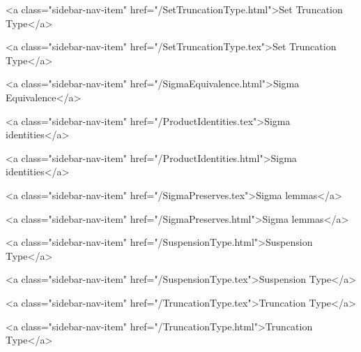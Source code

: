       
    
      
        
          <a class="sidebar-nav-item" href="/SetTruncationType.html">Set Truncation Type</a>
        
      
    
      
        
          <a class="sidebar-nav-item" href="/SetTruncationType.tex">Set Truncation Type</a>
        
      
    
      
        
          <a class="sidebar-nav-item" href="/SigmaEquivalence.html">Sigma Equivalence</a>
        
      
    
      
        
          <a class="sidebar-nav-item" href="/ProductIdentities.tex">Sigma identities</a>
        
      
    
      
        
          <a class="sidebar-nav-item" href="/ProductIdentities.html">Sigma identities</a>
        
      
    
      
        
          <a class="sidebar-nav-item" href="/SigmaPreserves.tex">Sigma lemmas</a>
        
      
    
      
        
          <a class="sidebar-nav-item" href="/SigmaPreserves.html">Sigma lemmas</a>
        
      
    
      
        
          <a class="sidebar-nav-item" href="/SuspensionType.html">Suspension Type</a>
        
      
    
      
        
          <a class="sidebar-nav-item" href="/SuspensionType.tex">Suspension Type</a>
        
      
    
      
        
          <a class="sidebar-nav-item" href="/TruncationType.tex">Truncation Type</a>
        
      
    
      
        
          <a class="sidebar-nav-item" href="/TruncationType.html">Truncation Type</a>
        
